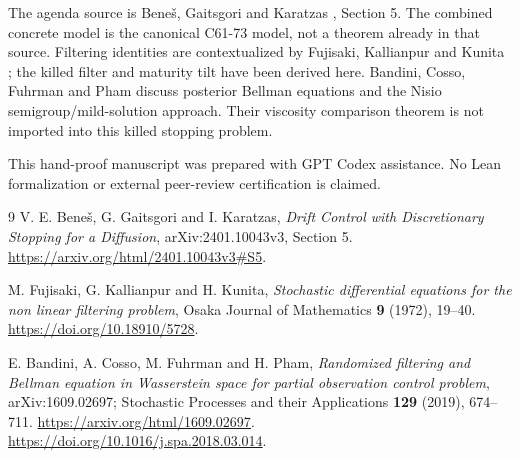 \documentclass[11pt,a4paper]{article}
\theoremstyle{definition}
\theoremstyle{remark}
\begin{document}
The agenda source is Beneš, Gaitsgori and Karatzas \cite{BGK},
Section 5. The combined concrete model is the canonical C61-73 model,
not a theorem already in that source. Filtering identities are
contextualized by Fujisaki, Kallianpur and Kunita \cite{FKK}; the killed
filter and maturity tilt have been derived here. Bandini, Cosso,
Fuhrman and Pham \cite{BCFP} discuss posterior Bellman equations and
the Nisio semigroup/mild-solution approach. Their viscosity comparison
theorem is not imported into this killed stopping problem.

This hand-proof manuscript was prepared with GPT Codex assistance.
No Lean formalization or external peer-review certification is claimed.

\begin{thebibliography}{9}
V. E. Beneš, G. Gaitsgori and I. Karatzas,
\emph{Drift Control with Discretionary Stopping for a Diffusion},
arXiv:2401.10043v3, Section 5.
\url{https://arxiv.org/html/2401.10043v3#S5}.

M. Fujisaki, G. Kallianpur and H. Kunita,
\emph{Stochastic differential equations for the non linear filtering
problem}, Osaka Journal of Mathematics \textbf{9} (1972), 19--40.
\url{https://doi.org/10.18910/5728}.

E. Bandini, A. Cosso, M. Fuhrman and H. Pham,
\emph{Randomized filtering and Bellman equation in Wasserstein space
for partial observation control problem}, arXiv:1609.02697;
Stochastic Processes and their Applications \textbf{129} (2019), 674--711.
\url{https://arxiv.org/html/1609.02697}.
\url{https://doi.org/10.1016/j.spa.2018.03.014}.
\end{thebibliography}
\end{document}

